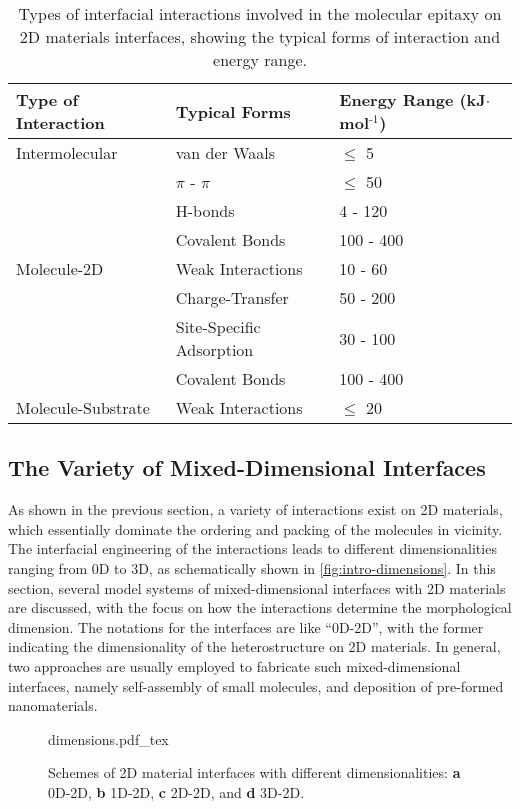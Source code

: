 \begin{table}[htbp]
\caption{\label{tbl:intro-interactions}
Types of interfacial interactions involved in the molecular epitaxy on 2D materials interfaces, showing the typical forms of interaction and energy range.}
\small
\centering
  \begin{tabular}[\textwidth]{lll}
\hline
Type of Interaction & Typical Forms & Energy Range  (kJ\(\cdot\)mol\(^{\text{-1}}\))\\
\hline
Intermolecular & van der Waals & \(\le\) 5\\
 & \(\pi\) - \(\pi\) & \(\le\) 50\\
 & H-bonds & 4 - 120 ~\cite{jeffrey_introduction_1997}\\
 & Covalent Bonds & 100 - 400\\
\hline
Molecule-2D & Weak Interactions & 10 - 60 ~\cite{Lazar_2013}\\
 & Charge-Transfer & 50 - 200\\
 & Site-Specific Adsorption & 30 - 100\\
 & Covalent Bonds & 100 - 400\\
\hline
Molecule-Substrate & Weak Interactions & \(\le\) 20\\
\hline
\end{tabular}
\end{table}

\subsection{The Variety of Mixed-Dimensional Interfaces}
\label{sec:vari-mixed-dimens}

As shown in the previous section, a variety of interactions exist on 2D
materials, which
essentially dominate the ordering and packing of the molecules in vicinity.
%
The interfacial engineering of the interactions leads to different
dimensionalities ranging from 0D to 3D, as schematically shown in
\autoref{fig:intro-dimensions}.
%
In this section, several model systems of mixed-dimensional interfaces
with 2D materials are discussed, with the focus on how the
interactions determine the morphological dimension. The notations for
the interfaces are like ``0D-2D'', with the former indicating the
dimensionality of the heterostructure on 2D materials. In general, two
approaches are usually employed to fabricate such mixed-dimensional
interfaces, namely self-assembly of small molecules, and deposition of
pre-formed nano\-materials. 

\begin{figure}[htbp]
  \centering
  {dimensions.pdf_tex}
  \caption{\label{fig:intro-dimensions} %
    Schemes of 2D material interfaces with different dimensionalities:
    \textbf{a} 0D-2D, \textbf{b} 1D-2D, \textbf{c} 2D-2D, and
    \textbf{d} 3D-2D.           %
  }
\end{figure}

